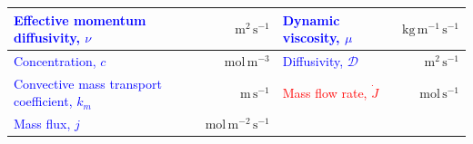 \documentclass[10pt, a4paper, table]{article}
\begin{document}
\begin{mdframed}
\begin{table}[H]
\begin{tabular}{lrlr}
\textcolor{blue}{Effective momentum diffusivity, $\nu$} & $\mathrm{m^{2}\,s^{-1}}$ 
& \textcolor{blue}{Dynamic viscosity, $\mu$} & $\mathrm{kg\,m^{-1}\,s^{-1}}$ \\

\midrule

\textcolor{blue}{Concentration, $c$} & $\mathrm{mol\,m^{-3}}$ 
& \textcolor{blue}{Diffusivity, $\mathcal{D}$} & $\mathrm{m^{2}\,s^{-1}}$ \\ 

\textcolor{blue}{Convective mass transport coefficient, $k_{m}$} & $\mathrm{m\,s^{-1}}$ 
& \textcolor{red}{Mass flow rate, $\dot{J}$} & $\mathrm{mol\,s^{-1}}$ \\ 

\textcolor{blue}{Mass flux, $j$} & $\mathrm{mol\,m^{-2}\,s^{-1}}$ \\

\bottomrule
\end{tabular}
\end{table}
\end{mdframed}
\end{document}
